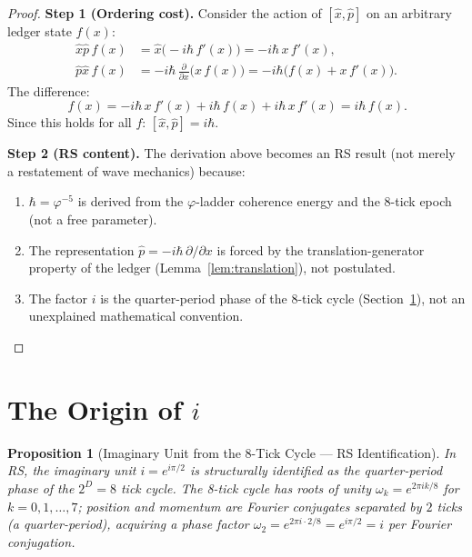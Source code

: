 \documentclass[12pt,a4paper]{article}
\newtheorem{proposition}[theorem]{Proposition}
\theoremstyle{definition}
\theoremstyle{remark}
\begin{document}
\begin{proof}
\textbf{Step 1 (Ordering cost).}
Consider the action of $[\hat{x}, \hat{p}]$ on an arbitrary
ledger state $f(x)$:
\begin{align}
  \hat{x}\hat{p}\,f(x) &= \hat{x}\bigl(-i\hbar\,f'(x)\bigr)
  = -i\hbar\,x\,f'(x), \\
  \hat{p}\hat{x}\,f(x) &= -i\hbar\,\frac{\partial}{\partial x}
  \bigl(x\,f(x)\bigr)
  = -i\hbar\bigl(f(x) + x\,f'(x)\bigr).
\end{align}
The difference:
\begin{equation}
  [\hat{x}, \hat{p}]\,f(x) = -i\hbar\,x\,f'(x)
  + i\hbar\,f(x) + i\hbar\,x\,f'(x) = i\hbar\,f(x).
\end{equation}
Since this holds for all $f$:
$[\hat{x}, \hat{p}] = i\hbar$.

\medskip
\textbf{Step 2 (RS content).}
The derivation above becomes an RS result (not merely a
restatement of wave mechanics) because:
\begin{enumerate}[label=(\alph*),nosep]
  \item $\hbar = \varphi^{-5}$ is derived from the
  $\varphi$-ladder coherence energy and the 8-tick epoch
  (not a free parameter).
  \item The representation
  $\hat{p} = -i\hbar\,\partial/\partial x$ is forced by the
  translation-generator property of the ledger
  (Lemma~\ref{lem:translation}), not postulated.
  \item The factor $i$ is the quarter-period phase of the 8-tick
  cycle (Section~\ref{sec:origin-i}), not an unexplained
  mathematical convention.
\end{enumerate}
\end{proof}

\section{The Origin of $i$}
\label{sec:origin-i}

\begin{proposition}[Imaginary Unit from the 8-Tick Cycle --- RS Identification]
\label{thm:i}
In RS, the imaginary unit $i = e^{i\pi/2}$ is structurally identified
as the quarter-period phase of the $2^D = 8$ tick cycle.  The 8-tick
cycle has roots of unity $\omega_k = e^{2\pi i k/8}$ for
$k = 0, 1, \ldots, 7$; position and momentum are Fourier conjugates
separated by $2$ ticks (a quarter-period), acquiring a phase factor
$\omega_2 = e^{2\pi i \cdot 2/8} = e^{i\pi/2} = i$ per Fourier conjugation.
\end{proposition}
\end{document}
